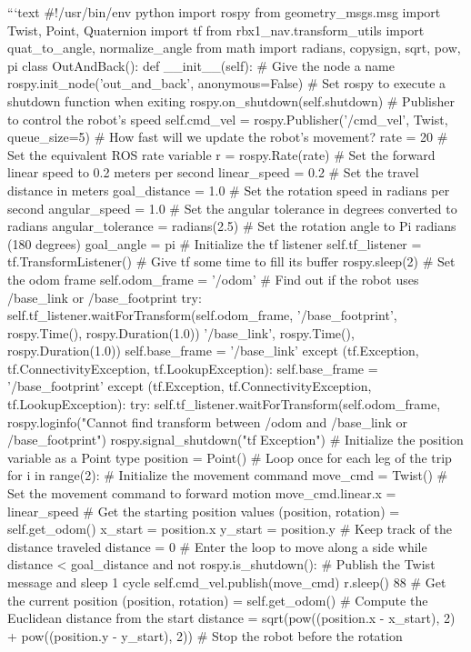 ```text
#!/usr/bin/env python
import rospy
from geometry_msgs.msg import Twist, Point, Quaternion
import tf
from rbx1_nav.transform_utils import quat_to_angle, normalize_angle
from math import radians, copysign, sqrt, pow, pi
class OutAndBack():
def __init__(self):
# Give the node a name
rospy.init_node('out_and_back', anonymous=False)
# Set rospy to execute a shutdown function when exiting
rospy.on_shutdown(self.shutdown)
# Publisher to control the robot's speed
self.cmd_vel = rospy.Publisher('/cmd_vel', Twist, queue_size=5)
# How fast will we update the robot's movement?
rate = 20
# Set the equivalent ROS rate variable
r = rospy.Rate(rate)
# Set the forward linear speed to 0.2 meters per second
linear_speed = 0.2
# Set the travel distance in meters
goal_distance = 1.0
# Set the rotation speed in radians per second
angular_speed = 1.0
# Set the angular tolerance in degrees converted to radians
angular_tolerance = radians(2.5)
# Set the rotation angle to Pi radians (180 degrees)
goal_angle = pi
# Initialize the tf listener
self.tf_listener = tf.TransformListener()
# Give tf some time to fill its buffer
rospy.sleep(2)
# Set the odom frame
self.odom_frame = '/odom'
# Find out if the robot uses /base_link or /base_footprint
try:
self.tf_listener.waitForTransform(self.odom_frame,
'/base_footprint', rospy.Time(), rospy.Duration(1.0))
'/base_link', rospy.Time(), rospy.Duration(1.0))
self.base_frame = '/base_link'
except (tf.Exception, tf.ConnectivityException, tf.LookupException):
self.base_frame = '/base_footprint'
except (tf.Exception, tf.ConnectivityException, tf.LookupException):
try: self.tf_listener.waitForTransform(self.odom_frame,
rospy.loginfo("Cannot find transform between /odom and /base_link or /base_footprint")
rospy.signal_shutdown("tf Exception")
# Initialize the position variable as a Point type
position = Point()
# Loop once for each leg of the trip
for i in range(2):
# Initialize the movement command
move_cmd = Twist()
# Set the movement command to forward motion
move_cmd.linear.x = linear_speed
# Get the starting position values
(position, rotation) = self.get_odom()
x_start = position.x
y_start = position.y
# Keep track of the distance traveled
distance = 0
# Enter the loop to move along a side
while distance < goal_distance and not rospy.is_shutdown():
# Publish the Twist message and sleep 1 cycle
self.cmd_vel.publish(move_cmd)
r.sleep() 88
# Get the current position
(position, rotation) = self.get_odom()
# Compute the Euclidean distance from the start
distance = sqrt(pow((position.x - x_start), 2) +
pow((position.y - y_start), 2))
# Stop the robot before the rotation
